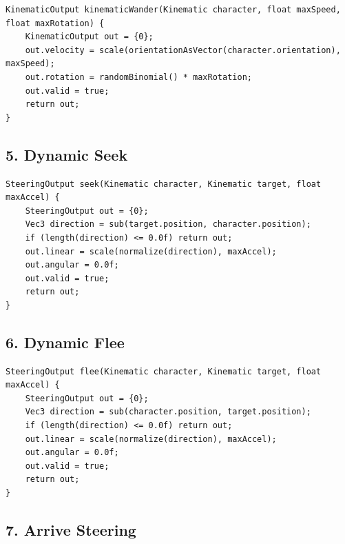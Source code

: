 \documentclass[10pt,letterpaper]{article}
\begin{document}
\begin{verbatim}
KinematicOutput kinematicWander(Kinematic character, float maxSpeed, float maxRotation) {
    KinematicOutput out = {0};
    out.velocity = scale(orientationAsVector(character.orientation), maxSpeed);
    out.rotation = randomBinomial() * maxRotation;
    out.valid = true;
    return out;
}
\end{verbatim}

\subsection*{5. Dynamic Seek}
{}

\begin{verbatim}
SteeringOutput seek(Kinematic character, Kinematic target, float maxAccel) {
    SteeringOutput out = {0};
    Vec3 direction = sub(target.position, character.position);
    if (length(direction) <= 0.0f) return out;
    out.linear = scale(normalize(direction), maxAccel);
    out.angular = 0.0f;
    out.valid = true;
    return out;
}
\end{verbatim}

\subsection*{6. Dynamic Flee}
{}

\begin{verbatim}
SteeringOutput flee(Kinematic character, Kinematic target, float maxAccel) {
    SteeringOutput out = {0};
    Vec3 direction = sub(character.position, target.position);
    if (length(direction) <= 0.0f) return out;
    out.linear = scale(normalize(direction), maxAccel);
    out.angular = 0.0f;
    out.valid = true;
    return out;
}
\end{verbatim}

\subsection*{7. Arrive Steering}
{}
\end{document}
